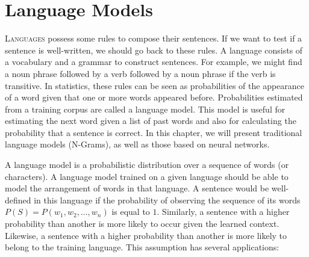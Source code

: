 \documentclass{KBook}
\begin{document}
		\mainmatter
	
\fi

\chapter{Language Models}

\begin{introduction}
	\lettrine{L}{anguages} possess some rules to compose their sentences. If we want to test if a sentence is well-written, we should go back to these rules. A language consists of a vocabulary and a grammar to construct sentences. For example, we might find a noun phrase followed by a verb followed by a noun phrase if the verb is transitive. In statistics, these rules can be seen as probabilities of the appearance of a word given that one or more words appeared before. Probabilities estimated from a training corpus are called a language model. This model is useful for estimating the next word given a list of past words and also for calculating the probability that a sentence is correct. In this chapter, we will present traditional language models (N-Grams), as well as those based on neural networks.
\end{introduction}

A language model is a probabilistic distribution over a sequence of words (or characters). A language model trained on a given language should be able to model the arrangement of words in that language. A sentence would be well-defined in this language if the probability of observing the sequence of its words $P(S) = P(w_1, w_2, ..., w_n)$ is equal to $1$. Similarly, a sentence with a higher probability than another is more likely to occur given the learned context. Likewise, a sentence with a higher probability than another is more likely to belong to the training language. This assumption has several applications:
\end{document}
